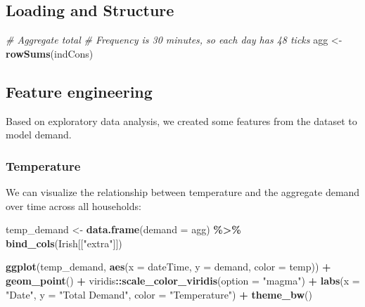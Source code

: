 \documentclass[
]{article}
\newenvironment{Shaded}{\begin{snugshade}}{\end{snugshade}}
\newcommand{\CommentTok}[1]{\textcolor[rgb]{0.56,0.35,0.01}{\textit{#1}}}
\newcommand{\DataTypeTok}[1]{\textcolor[rgb]{0.13,0.29,0.53}{#1}}
\newcommand{\KeywordTok}[1]{\textcolor[rgb]{0.13,0.29,0.53}{\textbf{#1}}}
\newcommand{\NormalTok}[1]{#1}
\newcommand{\OperatorTok}[1]{\textcolor[rgb]{0.81,0.36,0.00}{\textbf{#1}}}
\newcommand{\StringTok}[1]{\textcolor[rgb]{0.31,0.60,0.02}{#1}}
\begin{document}
\hypertarget{loading-and-structure}{%
\subsection{Loading and Structure}\label{loading-and-structure}}

\begin{Shaded}
\begin{Highlighting}[]
\CommentTok{\# Aggregate total}
\CommentTok{\# Frequency is 30 minutes, so each day has 48 ticks}
\NormalTok{agg \textless{}{-}}\StringTok{ }\KeywordTok{rowSums}\NormalTok{(indCons)}
\end{Highlighting}
\end{Shaded}

\hypertarget{feature-engineering}{%
\subsection{Feature engineering}\label{feature-engineering}}

Based on exploratory data analysis, we created some features from the
dataset to model demand.

\hypertarget{temperature}{%
\subsubsection{Temperature}\label{temperature}}

We can visualize the relationship between temperature and the aggregate
demand over time across all households:

\begin{Shaded}
\begin{Highlighting}[]
\NormalTok{temp\_demand \textless{}{-}}\StringTok{ }\KeywordTok{data.frame}\NormalTok{(}\DataTypeTok{demand =}\NormalTok{ agg) }\OperatorTok{\%\textgreater{}\%}
\StringTok{  }\KeywordTok{bind\_cols}\NormalTok{(Irish[[}\StringTok{"extra"}\NormalTok{]])}

\KeywordTok{ggplot}\NormalTok{(temp\_demand, }\KeywordTok{aes}\NormalTok{(}\DataTypeTok{x =}\NormalTok{ dateTime, }\DataTypeTok{y =}\NormalTok{ demand, }\DataTypeTok{color =}\NormalTok{ temp)) }\OperatorTok{+}
\StringTok{  }\KeywordTok{geom\_point}\NormalTok{() }\OperatorTok{+}
\StringTok{  }\NormalTok{viridis}\OperatorTok{::}\KeywordTok{scale\_color\_viridis}\NormalTok{(}\DataTypeTok{option =} \StringTok{"magma"}\NormalTok{) }\OperatorTok{+}
\StringTok{  }\KeywordTok{labs}\NormalTok{(}\DataTypeTok{x =} \StringTok{"Date"}\NormalTok{, }\DataTypeTok{y =} \StringTok{"Total Demand"}\NormalTok{, }\DataTypeTok{color =} \StringTok{"Temperature"}\NormalTok{) }\OperatorTok{+}
\StringTok{  }\KeywordTok{theme\_bw}\NormalTok{()}
\end{Highlighting}
\end{Shaded}
\end{document}

